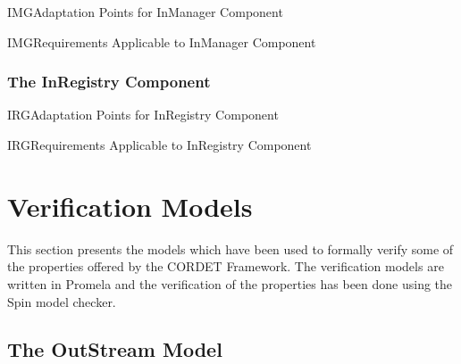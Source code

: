 \documentclass[a4paper,10pt]{article}
\let\stdsection\section
\renewcommand\section{\newpage\stdsection}
\newenvironment{cr_req}[2]
{%
\begin{longtable}{|l|p{9.8cm}|}
\caption{#2} \\
\hline
\rowcolor{light-gray}
\textbf{Req. ID} & \textbf{Requirement Text}\\
\hline\hline
\endfirsthead
\rowcolor{light-gray}
\textbf{Req. ID} & \textbf{Requirement Text}\\
\hline\hline
\endhead
\DTLforeach*[\DTLiseq{\cat}{#1}]{dbReq}{\cat=Category,\type=Type,\id=Id,\reqText=Text}
{\DTLiffirstrow{}{\\\hline}\cat-\id/\type & \textit{\reqText}}\\\hline
}
{\end{longtable}}
\newenvironment{cr_ap}[2]
{%
\begin{longtable}{|l|p{4.7cm}|p{4.9cm}|}
\caption{#2} \\
\hline
\rowcolor{light-gray}
\textbf{AP ID} & \textbf{Adaptation Point} & \textbf{Default Value}\\
\hline\hline
\endfirsthead
\rowcolor{light-gray}
\textbf{AP ID} & \textbf{Adaptation Point} & \textbf{Default Value}\\
\hline\hline
\endhead
\DTLforeach*[\DTLiseq{\cat}{#1}]{dbAP}{\cat=Category,\id=Id,\ap=AP,\defValue=DefValue}
{\DTLiffirstrow{}{\\\hline}\cat-\id & \ap & \defValue}\\\hline
}
{\end{longtable}}
\begin{document}
\begin{cr_ap}{IMG}{Adaptation Points for InManager Component}
\end{cr_ap}

\begin{cr_req}{IMG}{Requirements Applicable to InManager Component}
\end{cr_req}

\subsubsection{The InRegistry Component}\label{sec:InRegistry}


\begin{cr_ap}{IRG}{Adaptation Points for InRegistry Component}
\end{cr_ap}

\begin{cr_req}{IRG}{Requirements Applicable to InRegistry Component}
\end{cr_req}


\appendix
\section{Verification Models}\label{sec:VerModels}
This section presents the models which have been used to formally verify some of the properties offered by the CORDET Framework. The verification models are written in Promela and the verification of the properties has been done using the Spin model checker.

\subsection{The OutStream Model}\label{sec:OutStreamModel}
\end{document}
